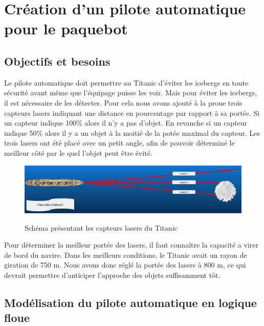 \documentclass[a4paper,11pt]{article}
\begin{document}
    \newpage
    \section{Création d'un pilote automatique pour le paquebot}

    \subsection{Objectifs et besoins}

    Le pilote automatique doit permettre au Titanic d’éviter les icebergs en toute sécurité avant même que l'équipage puisse les voir.
    Mais pour éviter les icebergs, il est nécessaire de les détecter. Pour cela nous avons ajouté à la proue trois capteurs lasers indiquant une distance en pourcentage par rapport à sa portée.
    Si un capteur indique 100\% alors il n'y a pas d'objet. En revanche si un capteur indique 50\% alors il y a un objet à la moitié de la potée maximal du capteur. Les trois lasers ont été placé avec un petit angle, afin de pouvoir déterminé le meilleur côté par le quel l'objet peut être évité.

    \begin{figure}[H]
        \begin{center}
            \caption{Schéma présentant les capteurs lasers du Titanic}
            \includegraphics[scale=0.26]{assets/Lasers_Illustration.jpg}
            \label{fig:titanicLasers}
        \end{center}
    \end{figure}

    Pour déterminer la meilleur portée des lasers, il faut connaître la capacité a virer de bord du navire. Dans les meilleurs conditions, le Titanic avait un rayon de giration de 750 m. Nous avons donc réglé la portée des lasers à 800 m, ce qui devrait permettre d’anticiper l’approche des objets suffisamment tôt.

    \subsection{Modélisation du pilote automatique en logique floue}
\end{document}
